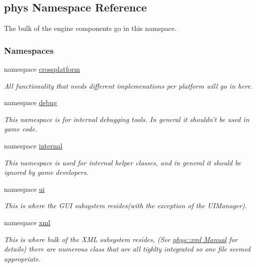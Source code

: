 \hypertarget{namespacephys}{
\subsection{phys Namespace Reference}
\label{namespacephys}
}


The bulk of the engine components go in this namspace.  


\subsubsection*{Namespaces}
\begin{DoxyCompactItemize}
\item 
namespace \hyperlink{namespacephys_1_1crossplatform}{crossplatform}


\begin{DoxyCompactList}\small\item\em All functionality that needs different implemenations per platform will go in here. \item\end{DoxyCompactList}

\item 
namespace \hyperlink{namespacephys_1_1debug}{debug}


\begin{DoxyCompactList}\small\item\em This namespace is for internal debugging tools. In general it shouldn't be used in game code. \item\end{DoxyCompactList}

\item 
namespace \hyperlink{namespacephys_1_1internal}{internal}


\begin{DoxyCompactList}\small\item\em This namespace is used for internal helper classes, and in general it should be ignored by game developers. \item\end{DoxyCompactList}

\item 
namespace \hyperlink{namespacephys_1_1ui}{ui}


\begin{DoxyCompactList}\small\item\em This is where the GUI subsystem resides(with the exception of the UIManager). \item\end{DoxyCompactList}

\item 
namespace \hyperlink{namespacephys_1_1xml}{xml}


\begin{DoxyCompactList}\small\item\em This is where bulk of the XML subsystem resides, (See \hyperlink{XMLManual}{phys::xml Manual} for details) there are numerous class that are all tighlty integrated so one file seemed appropriate. \item\end{DoxyCompactList}

\end{DoxyCompactItemize}
